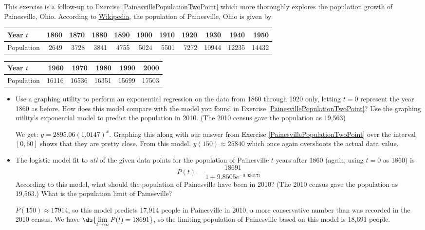 \documentclass{ximera}
\begin{document}
\begin{problem}\label{PainesvillePopulationManyPoints}
    This exercise is a follow-up to Exercise \ref{PainesvillePopulationTwoPoint} which more thoroughly explores the population growth of Painesville, Ohio.  According to \href{http://en.wikipedia.org/wiki/Painesville}{\underline{Wikipedia}}, the population of Painesville, Ohio is given by


\begin{tabular}{|l|r|r|r|r|r|r|r|r|r|r|} \hline
Year $t$ & 1860 & 1870 & 1880 & 1890 & 1900 & 1910 & 1920 & 1930 & 1940 & 1950 \\ \hline 
Population& 2649 & 3728 & 3841 & 4755 & 5024 & 5501 & 7272 & 10944 & 12235 & 14432 \\ \hline
\end{tabular}

\begin{tabular}{|l|r|r|r|r|r|} \hline
Year $t$ & 1960 & 1970 & 1980 & 1990 & 2000 \\ \hline 
Population& 16116 & 16536 & 16351 & 15699 & 17503 \\ \hline
\end{tabular}

\begin{itemize}
    \item 
    Use a graphing utility to perform an exponential regression on the data from 1860 through 1920 only, letting $t = 0$ represent the year 1860 as before.  How does this model compare with the model you found in Exercise \ref{PainesvillePopulationTwoPoint}?   Use the graphing utility's exponential model to predict the population in 2010.   (The 2010 census gave the population as 19,563)

\begin{solution}
 We get:  $y = 2895.06 (1.0147)^{x}$.  Graphing this along with our answer from Exercise \ref{PainesvillePopulationTwoPoint} over the interval $[0,60]$ shows that they are pretty close. From this model, $y(150) \approx 25840$ which once again overshoots the actual data value.
\end{solution}

\item 
     The logistic model fit to \emph{all} of the given data points for the population of Painesville $t$ years after 1860 (again, using $t = 0$ as 1860) is \[ P(t) = \dfrac{18691}{1+9.8505e^{-0.03617t}} \] According to this model, what should the population of Painesville have been in 2010?  (The 2010 census gave the population as 19,563.) What is the population limit of Painesville?

\begin{solution}
$P(150) \approx 17914$, so this model predicts 17,914 people in Painesville in 2010, a more conservative number than was recorded in the 2010 census.  We have $\ds{\lim_{t \rightarrow \infty} P(t) =  18691}$,  so the limiting population of Painesville based on this model is 18,691 people.
\end{solution}
\end{itemize}

\end{problem}
\end{document}
